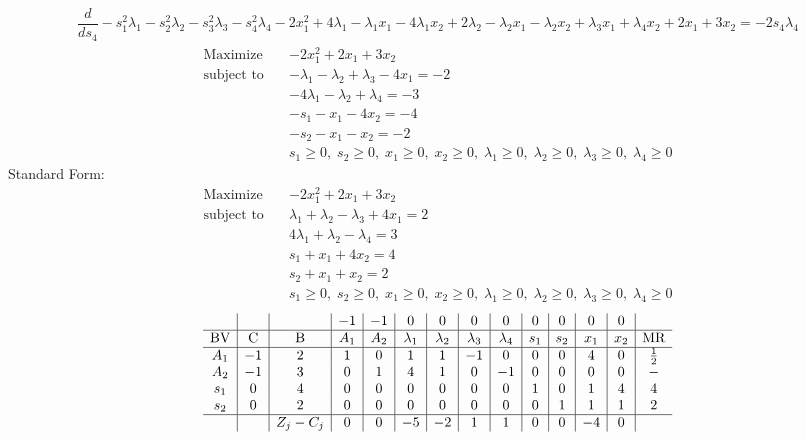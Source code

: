 \documentclass{article}
\begin{document}
\begin{align*}
\dfrac{d}{ds_{4}}-s_{1}^{2}\lambda_{1} - s_{2}^{2}\lambda_{2} - s_{3}^{2}\lambda_{3} - s_{4}^{2}\lambda_{4} - 2x_{1}^{2} + 4\lambda_{1} - \lambda_{1}x_{1} - 4\lambda_{1}x_{2} + 2\lambda_{2} - \lambda_{2}x_{1} - \lambda_{2}x_{2} + \lambda_{3}x_{1} + \lambda_{4}x_{2} + 2x_{1} + 3x_{2}=-2s_{4}\lambda_{4}\end{align*}
\begin{align*}
\text{Maximize} \quad & -2x_{1}^{2} + 2x_{1} + 3x_{2}\\
\text{subject to} \quad
& -\lambda_{1} - \lambda_{2} + \lambda_{3} - 4x_{1}=-2\\
& -4\lambda_{1} - \lambda_{2} + \lambda_{4}=-3\\
& -s_{1} - x_{1} - 4x_{2}=-4\\
& -s_{2} - x_{1} - x_{2}=-2\\
& s_{1}\ge0,\; s_{2}\ge0,\; x_{1}\ge0,\; x_{2}\ge0,\; \lambda_{1}\ge0,\; \lambda_{2}\ge0,\; \lambda_{3}\ge0,\; \lambda_{4}\ge0\end{align*}
Standard Form:\\
\begin{align*}
\text{Maximize} \quad & -2x_{1}^{2} + 2x_{1} + 3x_{2}\\
\text{subject to} \quad
& \lambda_{1} + \lambda_{2} - \lambda_{3} + 4x_{1}=2\\
& 4\lambda_{1} + \lambda_{2} - \lambda_{4}=3\\
& s_{1} + x_{1} + 4x_{2}=4\\
& s_{2} + x_{1} + x_{2}=2\\
& s_{1}\ge0,\; s_{2}\ge0,\; x_{1}\ge0,\; x_{2}\ge0,\; \lambda_{1}\ge0,\; \lambda_{2}\ge0,\; \lambda_{3}\ge0,\; \lambda_{4}\ge0\end{align*}
\begin{align*}
\begin{array}{c|c|c|c|c|c|c|c|c|c|c|c|c|c}
 &  &  & -1 & -1 & 0 & 0 & 0 & 0 & 0 & 0 & 0 & 0 & \\
\hline
\text{BV} & \text{C} & \text{B} & A_{1} & A_{2} & \lambda_{1} & \lambda_{2} & \lambda_{3} & \lambda_{4} & s_{1} & s_{2} & x_{1} & x_{2} & \text{MR} \\
\hline
A_{1} & -1 & 2 & 1 & 0 & 1 & 1 & -1 & 0 & 0 & 0 & 4 & 0 & \frac{1}{2} \\
A_{2} & -1 & 3 & 0 & 1 & 4 & 1 & 0 & -1 & 0 & 0 & 0 & 0 & - \\
s_{1} & 0 & 4 & 0 & 0 & 0 & 0 & 0 & 0 & 1 & 0 & 1 & 4 & 4 \\
s_{2} & 0 & 2 & 0 & 0 & 0 & 0 & 0 & 0 & 0 & 1 & 1 & 1 & 2 \\
\hline
 &  & Z_j-C_j & 0 & 0 & -5 & -2 & 1 & 1 & 0 & 0 & -4 & 0 & \\
\end{array}
\end{align*}
\end{document}
